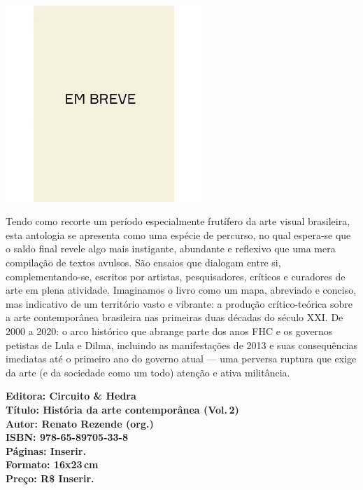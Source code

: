 \begin{center}
\hspace*{.5cm}\includegraphics[width=74mm]{./CAPAS/breve.jpeg}
\end{center}
\hspace*{-7cm}\hrulefill\hspace*{-7cm}
\medskip

\noindent{}Tendo como recorte um período especialmente frutífero da arte visual brasileira, esta antologia se apresenta como uma espécie de percurso, no qual espera-se que o saldo final revele algo mais instigante, abundante e reflexivo que uma mera compilação de textos avulsos. São ensaios que dialogam entre si, complementando-se, escritos por artistas, pesquisadores, críticos e curadores de arte em plena atividade. Imaginamos o livro como um mapa, abreviado e conciso, mas indicativo de um território vasto e vibrante: a produção crítico-teórica sobre a arte contemporânea brasileira nas primeiras duas décadas do século XXI. De 2000 a 2020: o arco histórico que abrange parte dos anos FHC e os governos petistas de Lula e Dilma, incluindo as manifestações de 2013 e suas consequências imediatas até o primeiro ano do governo atual --- uma perversa ruptura que exige da arte (e da sociedade como um todo) atenção e ativa militância.

\vfill
\noindent\begin{minipage}[c]{1\linewidth}
{\small\textbf{
\hspace*{-.1cm}Editora: Circuito \& Hedra\\
Título: História da arte contemporânea (Vol.\,2)\\
Autor: Renato Rezende (org.)\\ 
ISBN: 978-65-89705-33-8\\
Páginas: Inserir.\\
Formato: 16x23\,cm\\
Preço: R\$ Inserir.\\
}}
\end{minipage}
\pagebreak

